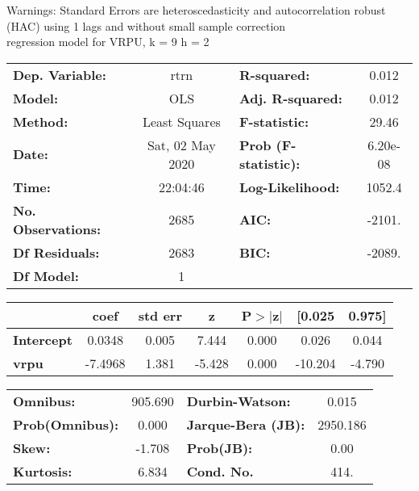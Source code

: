 Warnings: \newline
 [1] Standard Errors are heteroscedasticity and autocorrelation robust (HAC) using 1 lags and without small sample correction\\ 

regression model for VRPU, k = 9 h = 2\begin{center}
\begin{tabular}{lclc}
\toprule
\textbf{Dep. Variable:}    &       rtrn       & \textbf{  R-squared:         } &     0.012   \\
\textbf{Model:}            &       OLS        & \textbf{  Adj. R-squared:    } &     0.012   \\
\textbf{Method:}           &  Least Squares   & \textbf{  F-statistic:       } &     29.46   \\
\textbf{Date:}             & Sat, 02 May 2020 & \textbf{  Prob (F-statistic):} &  6.20e-08   \\
\textbf{Time:}             &     22:04:46     & \textbf{  Log-Likelihood:    } &    1052.4   \\
\textbf{No. Observations:} &        2685      & \textbf{  AIC:               } &    -2101.   \\
\textbf{Df Residuals:}     &        2683      & \textbf{  BIC:               } &    -2089.   \\
\textbf{Df Model:}         &           1      & \textbf{                     } &             \\
\bottomrule
\end{tabular}
\begin{tabular}{lcccccc}
                   & \textbf{coef} & \textbf{std err} & \textbf{z} & \textbf{P$> |$z$|$} & \textbf{[0.025} & \textbf{0.975]}  \\
\midrule
\textbf{Intercept} &       0.0348  &        0.005     &     7.444  &         0.000        &        0.026    &        0.044     \\
\textbf{vrpu}      &      -7.4968  &        1.381     &    -5.428  &         0.000        &      -10.204    &       -4.790     \\
\bottomrule
\end{tabular}
\begin{tabular}{lclc}
\textbf{Omnibus:}       & 905.690 & \textbf{  Durbin-Watson:     } &    0.015  \\
\textbf{Prob(Omnibus):} &   0.000 & \textbf{  Jarque-Bera (JB):  } & 2950.186  \\
\textbf{Skew:}          &  -1.708 & \textbf{  Prob(JB):          } &     0.00  \\
\textbf{Kurtosis:}      &   6.834 & \textbf{  Cond. No.          } &     414.  \\
\bottomrule
\end{tabular}
\end{center}

